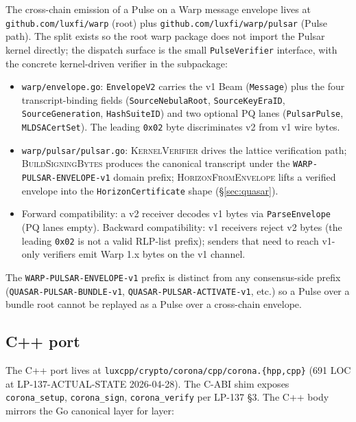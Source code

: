 The cross-chain emission of a Pulse on a Warp message envelope lives at \texttt{github.com/luxfi/warp} (root) plus \texttt{github.com/luxfi/warp/pulsar} (Pulse path). The split exists so the root warp package does not import the Pulsar kernel directly; the dispatch surface is the small \texttt{PulseVerifier} interface, with the concrete kernel-driven verifier in the subpackage:

\begin{itemize}
\item \texttt{warp/envelope.go}: \texttt{EnvelopeV2} carries the v1 Beam (\texttt{Message}) plus the four transcript-binding fields (\texttt{SourceNebulaRoot}, \texttt{SourceKeyEraID}, \texttt{SourceGeneration}, \texttt{HashSuiteID}) and two optional PQ lanes (\texttt{PulsarPulse}, \texttt{MLDSACertSet}). The leading \texttt{0x02} byte discriminates v2 from v1 wire bytes.
\item \texttt{warp/pulsar/pulsar.go}: \textsc{KernelVerifier} drives the lattice verification path; \textsc{BuildSigningBytes} produces the canonical transcript under the \texttt{WARP-PULSAR-ENVELOPE-v1} domain prefix; \textsc{HorizonFromEnvelope} lifts a verified envelope into the \texttt{HorizonCertificate} shape (\S\ref{sec:quasar}).
\item Forward compatibility: a v2 receiver decodes v1 bytes via \texttt{ParseEnvelope} (PQ lanes empty). Backward compatibility: v1 receivers reject v2 bytes (the leading \texttt{0x02} is not a valid RLP-list prefix); senders that need to reach v1-only verifiers emit Warp 1.x bytes on the v1 channel.
\end{itemize}

The \texttt{WARP-PULSAR-ENVELOPE-v1} prefix is distinct from any consensus-side prefix (\texttt{QUASAR-PULSAR-BUNDLE-v1}, \texttt{QUASAR-PULSAR-ACTIVATE-v1}, etc.) so a Pulse over a bundle root cannot be replayed as a Pulse over a cross-chain envelope.

\subsection{C++ port}

The C++ port lives at \texttt{luxcpp/crypto/corona/cpp/corona.\{hpp,cpp\}} \cite{lp137} (691 LOC at LP-137-ACTUAL-STATE 2026-04-28). The C-ABI shim exposes \texttt{corona\_setup}, \texttt{corona\_sign}, \texttt{corona\_verify} per LP-137 \S3. The C++ body mirrors the Go canonical layer for layer:

